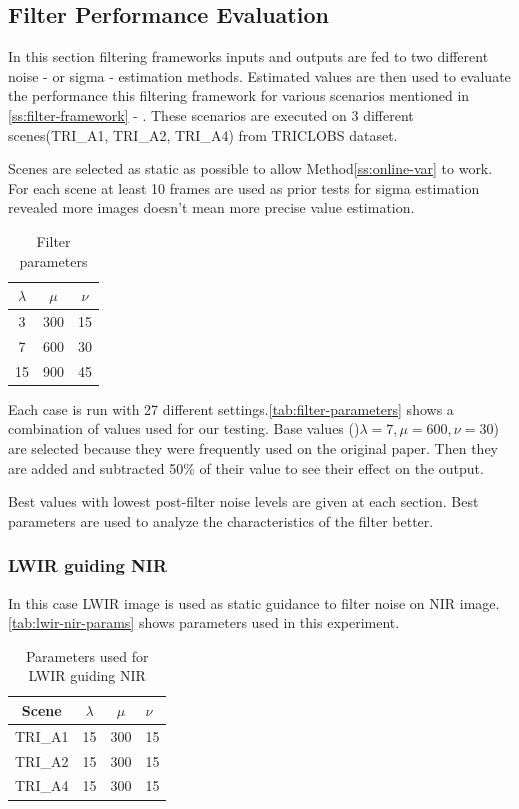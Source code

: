 \documentclass[10pt,twocolumn,letterpaper]{article}
\begin{document}
	\subsection{Filter Performance Evaluation}
	In this section filtering frameworks inputs and outputs are fed to two different noise - or sigma - estimation methods. Estimated values are then used to evaluate the performance this filtering framework for various scenarios mentioned in  \ref{ss:filter-framework} -  . These scenarios are executed on 3 different scenes(TRI\_A1, TRI\_A2, TRI\_A4) from TRICLOBS\cite{triclobs} dataset. 
	
	Scenes are selected as static as possible to allow Method\ref{ss:online-var} to work. For each scene at least 10 frames are used as prior tests for sigma estimation revealed more images doesn't mean more precise value estimation.
	\begin{table}[!h]
		\centering
		\caption{Filter parameters}
		\label{tab:filter-parameters}
		\begin{tabular}{ccc}
			\hline
			\(\lambda\) & \(\mu\) & \(\nu\) \\ \hline
			3           & 300     & 15      \\
			7           & 600     & 30      \\
			15          & 900     & 45      \\ \hline
		\end{tabular}
	\end{table}
	
	Each case is run with 27 different settings.\autoref{tab:filter-parameters} shows a combination of values used for our testing. Base values ()\(\lambda=7, \mu=600, \nu=30\)) are selected because they were frequently used on the original paper. Then they are added and subtracted 50\% of their value to see their effect on the output. 
	
	Best values with lowest post-filter noise levels are given at each section. Best parameters are used to analyze the characteristics of the filter better.
	\subsubsection{LWIR guiding NIR}
	In this case LWIR image is used as static guidance to filter noise on NIR image. \autoref{tab:lwir-nir-params} shows parameters used in this experiment.
	\begin{table}[!ht]
		\centering
		\caption{Parameters used for LWIR guiding NIR}
		\label{tab:lwir-nir-params}
		\begin{tabular}{@{}cccl@{}}
			\toprule
			\bfseries Scene & \(\lambda\) & \(\mu\) & \(\nu\) \\ \midrule
			TRI\_A1               & 15        	& 300	  & 15       \\
			TRI\_A2               & 15       	& 300	  & 15       \\
			TRI\_A4               & 15        	& 300	  & 15       \\ \bottomrule
		\end{tabular}
	\end{table}
\end{document}
